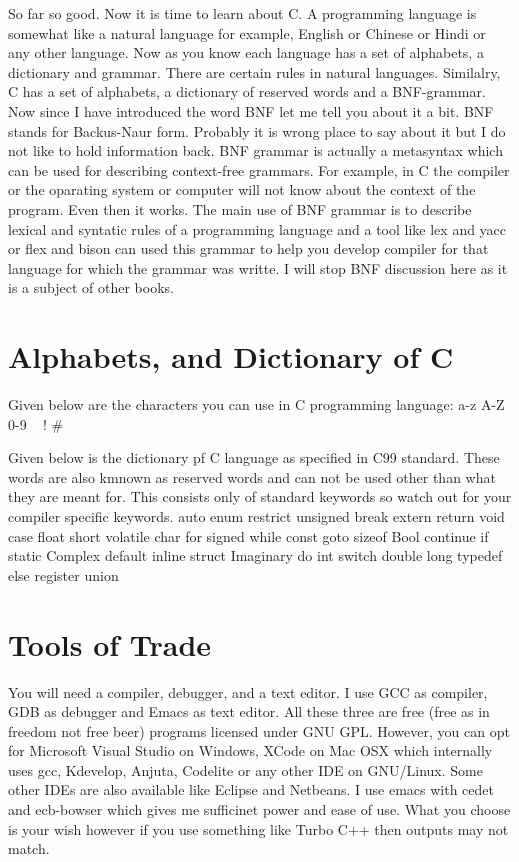So far so good. Now it is time to learn about C. A programming language is
somewhat like a natural language for example, English or Chinese or Hindi or any
other language. Now as you know each language has a set of alphabets, a
dictionary and grammar. There are certain rules in natural languages. Similalry,
C has a set of alphabets, a dictionary of reserved words and a BNF-grammar.
Now since I have introduced the word BNF let me tell you about it a bit. BNF
stands for Backus-Naur form. Probably it is wrong place to say about it but I do
not like to hold information back. BNF grammar is actually a metasyntax which
can be used for describing context-free grammars. For example, in C the compiler
or the oparating system or computer will not know about the context of the
program. Even then it works. The main use of BNF grammar is to describe lexical
and syntatic rules of a programming language and a tool like lex and yacc or
flex and bison can used this grammar to help you develop compiler for that
language for which the grammar was writte. I will stop BNF discussion here as it
is a subject of other books.

\section{Alphabets, and Dictionary of C}
Given below are the characters you can use in C programming language:\hfil\break
\starttyping
a-z A-Z 0-9 ~ ! # %
\stoptyping

Given below is the dictionary pf C language as specified in C99 standard. These
words are also kmnown as reserved words and can not be used other than what
they are meant for. This  consists only of standard
keywords so watch out for your compiler specific keywords.
{\starttable[|c| c| c| c|]
\HL
\VL auto \NC enum \NC  restrict \NC  unsigned\VL\FR
\VL  break \NC extern \NC return \NC void \VL\FR
\VL case \NC float \NC short \NC volatile\VL\FR
\VL char \NC for \NC signed \NC while\VL\FR
\VL const \NC goto \NC sizeof \NC \type{_}Bool\VL\FR
\VL continue \NC if \NC static \NC \type{_}Complex\VL\FR
\VL default \NC inline \NC struct \NC \type{_}Imaginary\VL\FR
\VL do \NC int \NC switch \NC \VL\FR
\VL double \NC long \NC typedef\NC  \VL\FR
\VL else \NC register \NC union\NC  \VL\LR
\HL
\stoptable}

\section{Tools of Trade}
You will need a compiler, debugger, and a text editor. I use GCC as compiler,
GDB as debugger and Emacs as text editor. All these three are free (free as in
freedom not free beer)  programs licensed under GNU GPL. However, you can opt
for Microsoft Visual Studio on Windows, XCode on Mac OSX which internally uses
gcc, Kdevelop, Anjuta, Codelite or any other IDE on GNU/Linux. Some other IDEs
are also available like Eclipse and Netbeans. I use emacs with cedet and
ecb-bowser which gives me sufficinet power and ease of use. What you choose is
your wish however if you use something like Turbo C++ then outputs may not
match.

